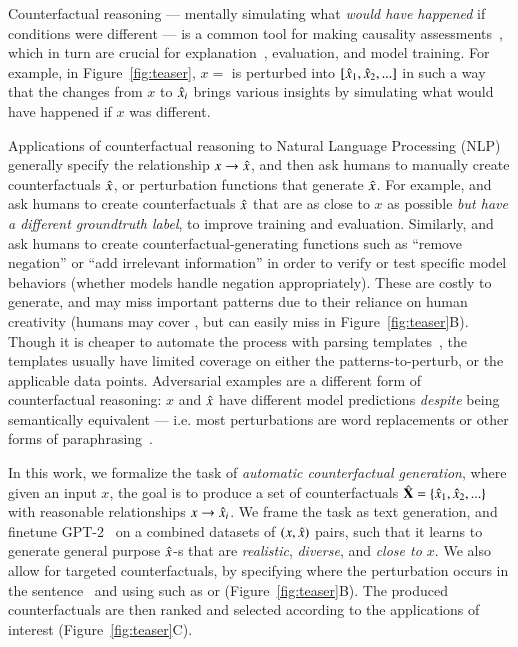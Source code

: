 Counterfactual reasoning --- mentally simulating what \emph{would have happened} if conditions were different --- is a common tool for making causality assessments~\cite{kahneman}, which in turn are crucial for explanation~\cite{miller}, evaluation, and model training. For example, in Figure~\ref{fig:teaser}, $x=$  is perturbed into $[\hat{x}_1, \hat{x}_2, ...]$ in such a way that the changes from $x$ to $\hat{x}_i$ brings various insights by simulating what would have happened if $x$ was different.

Applications of counterfactual reasoning to Natural Language Processing (NLP) generally specify the relationship $x \rightarrow \hat{x}$, and then ask humans to manually create counterfactuals $\hat{x}$, or perturbation functions that generate $\hat{x}$.
For example, \citet{gardner2020contrast} and \citet{kaushik2019learning} ask humans to create counterfactuals $\hat{x}$ that are as close to $x$ as possible \emph{but have a different groundtruth label}, to improve training and evaluation. 
Similarly, \citet{wu2019errudite} and \citet{checklist:acl20} ask humans to create counterfactual-generating functions such as ``remove negation'' or ``add irrelevant information'' in order to verify or test specific model behaviors (\eg whether models handle negation appropriately).
These are costly to generate, and may miss important patterns due to their reliance on human creativity (\eg humans may cover , but can easily miss  in Figure~\ref{fig:teaser}B).
Though it is cheaper to automate the process with parsing templates~\cite{li2020linguistically}, the templates usually have limited coverage on either the patterns-to-perturb, or the applicable data points.
Adversarial examples are a different form of counterfactual reasoning: $x$ and $\hat{x}$ have different model predictions \emph{despite} being semantically equivalent --- i.e. most perturbations are word replacements or other forms of paraphrasing~\cite{iyyer2018adversarial, ribeiro2018semantically}.



In this work, we formalize the task of \emph{automatic counterfactual generation}, where given an input $x$, the goal is to produce a set of counterfactuals $\hat{\mathbf{X}} = \{\hat{x}_1, \hat{x}_2, ...\}$ with reasonable relationships $x \rightarrow \hat{x}_i$. 
We frame the task as text generation, and finetune GPT-2~\cite{radford2019language} on a combined datasets of  $(x, \hat{x})$ pairs, such that it learns to generate general purpose $\hat{x}$-s that are \emph{realistic}, \emph{diverse}, and \emph{close to $x$}.
We also allow for targeted counterfactuals, by specifying where the perturbation occurs in the sentence~\cite{donahue2020enabling} and using \tagstrs such as  or  (Figure~\ref{fig:teaser}B). 
The produced counterfactuals are then ranked and selected according to the applications of interest (Figure~\ref{fig:teaser}C).

